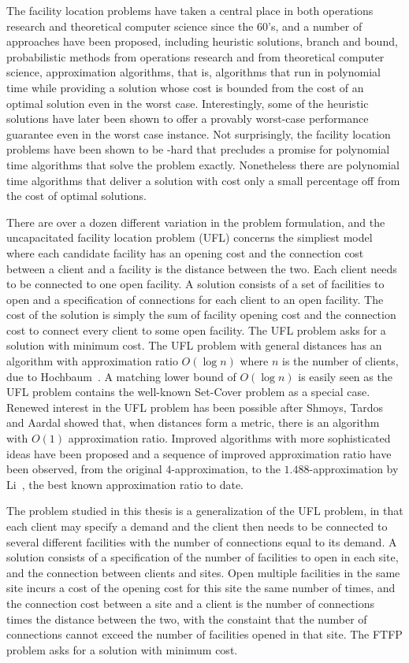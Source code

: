 \documentclass[oneside,final]{ucr}
\begin{document}
The facility location problems have taken a central place in both
operations research and theoretical computer science since the 60's,
and a number of approaches have been proposed, including heuristic
solutions, branch and bound, probabilistic methods from operations
research and from theoretical computer science, approximation
algorithms, that is, algorithms that run in polynomial time while
providing a solution whose cost is bounded from the cost of an optimal
solution even in the worst case. Interestingly, some of the heuristic
solutions have later been shown to offer a provably worst-case
performance guarantee even in the worst case instance. Not
surprisingly, the facility location problems have been shown to be
\NP-hard that precludes a promise for polynomial time algorithms that
solve the problem exactly. Nonetheless there are polynomial time
algorithms that deliver a solution with cost only a small percentage
off from the cost of optimal solutions.

There are over a dozen different variation in the problem formulation,
and the uncapacitated facility location problem (UFL) concerns the
simpliest model where each candidate facility has an opening cost and
the connection cost between a client and a facility is the distance
between the two. Each client needs to be connected to one open
facility. A solution consists of a set of facilities to open and a
specification of connections for each client to an open facility. The
cost of the solution is simply the sum of facility opening cost and
the connection cost to connect every client to some open facility. The
UFL problem asks for a solution with minimum cost. The UFL problem
with general distances has an algorithm with approximation ratio
$O(\log n)$ where $n$ is the number of clients, due to
Hochbaum~\cite{Hochbaum82}. A matching lower bound of $O(\log n)$ is
easily seen as the UFL problem contains the well-known Set-Cover
problem as a special case. Renewed interest in the UFL problem has
been possible after Shmoys, Tardos and Aardal showed that, when
distances form a metric, there is an algorithm with $O(1)$
approximation ratio. Improved algorithms with more sophisticated ideas
have been proposed and a sequence of improved approximation ratio have
been observed, from the original $4$-approximation, to the
$1.488$-approximation by Li~\cite{Li11}, the best known
approximation ratio to date.

The problem studied in this thesis is a generalization of the UFL
problem, in that each client may specify a demand and the client then
needs to be connected to several different facilities with the number
of connections equal to its demand.  A solution consists of a
specification of the number of facilities to open in each site, and
the connection between clients and sites. Open multiple facilities in
the same site incurs a cost of the opening cost for this site the same
number of times, and the connection cost between a site and a client
is the number of connections times the distance between the two, with
the constaint that the number of connections cannot exceed the number
of facilities opened in that site. The FTFP problem asks for a
solution with minimum cost.
\end{document}
